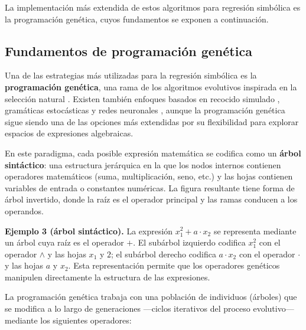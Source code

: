 La implementación más extendida de estos algoritmos para regresión simbólica es la programación genética, cuyos fundamentos se exponen a continuación.

\subsection{Fundamentos de programación genética}

Una de las estrategias más utilizadas para la regresión simbólica es la \textbf{programación genética}, una rama de los algoritmos evolutivos inspirada en la selección natural \cite{koza1992genetic}. Existen también enfoques basados en recocido simulado \cite{kantor2021simulated}, gramáticas estocásticas \cite{sotto2017probabilistic} y redes neuronales \cite{costa2021occamnet, deng2024operator}, aunque la programación genética sigue siendo una de las opciones más extendidas por su flexibilidad para explorar espacios de expresiones algebraicas.

En este paradigma, cada posible expresión matemática se codifica como un \textbf{árbol sintáctico}: una estructura jerárquica en la que los nodos internos contienen operadores matemáticos (suma, multiplicación, seno, etc.) y las hojas contienen variables de entrada o constantes numéricas. La figura resultante tiene forma de árbol invertido, donde la raíz es el operador principal y las ramas conducen a los operandos.

\bigskip \noindent\textbf{Ejemplo 3 (árbol sintáctico).} La expresión \(x_1^2 + a \cdot x_2\) se representa mediante un árbol cuya raíz es el operador \(+\). El subárbol izquierdo codifica \(x_1^2\) con el operador \(\wedge\) y las hojas \(x_1\) y \(2\); el subárbol derecho codifica \(a \cdot x_2\) con el operador \(\cdot\) y las hojas \(a\) y \(x_2\). Esta representación permite que los operadores genéticos manipulen directamente la estructura de las expresiones.

\begin{center}  \end{center}

La programación genética trabaja con una población de individuos (árboles) que se modifica a lo largo de generaciones —ciclos iterativos del proceso evolutivo— mediante los siguientes operadores:

